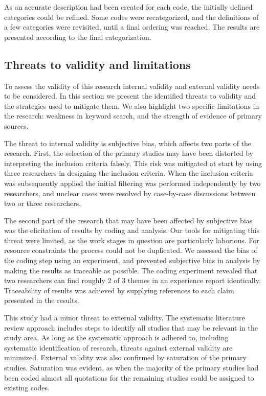 As an accurate description had been created for each code, the initially defined
categories could be refined. Some codes were recategorized, and the definitions
of a few categories were revisited, until a final ordering was reached. The
results are presented according to the final categorization.



\subsection{Threats to validity and limitations}

To assess the validity of this research internal validity and external validity
needs to be considered. In this section we present the identified threats to
validity and the strategies used to mitigate them. We also highlight two
specific limitations in the research: weakness in keyword search, and the
strength of evidence of primary sources.

The threat to internal validity is subjective bias, which affects two parts of
the research. First, the selection of the primary studies may have been
distorted by interpreting the inclusion criteria falsely. This risk was
mitigated at start by using three researchers in designing the inclusion
criteria. When the inclusion criteria was subsequently applied the initial
filtering was performed independently by two researchers, and unclear cases were
resolved by case-by-case discussions between two or three researchers.

The second part of the research that may have been affected by subjective bias
was the elicitation of results by coding and analysis. Our tools for mitigating
this threat were limited, as the work stages in question are particularly
laborious. For resource constraints the process could not be duplicated. We
assessed the bias of the coding step using an experiment, and prevented
subjective bias in analysis by making the results as traceable as possible. The
coding experiment revealed that two researchers can find roughly 2 of 3 themes
in an experience report identically. Traceability of results was achieved by
supplying references to each claim presented in the results.

This study had a minor threat to external validity. The systematic literature
review approach includes steps to identify all studies that may be relevant in
the study area. As long as the systematic approach is adhered to, including
systematic identification of research, threats against external validity are
minimized. External validity was also confirmed by saturation of the primary
studies. Saturation was evident, as when the majority of the primary studies had
been coded almost all quotations for the remaining studies could be assigned to
existing codes.

